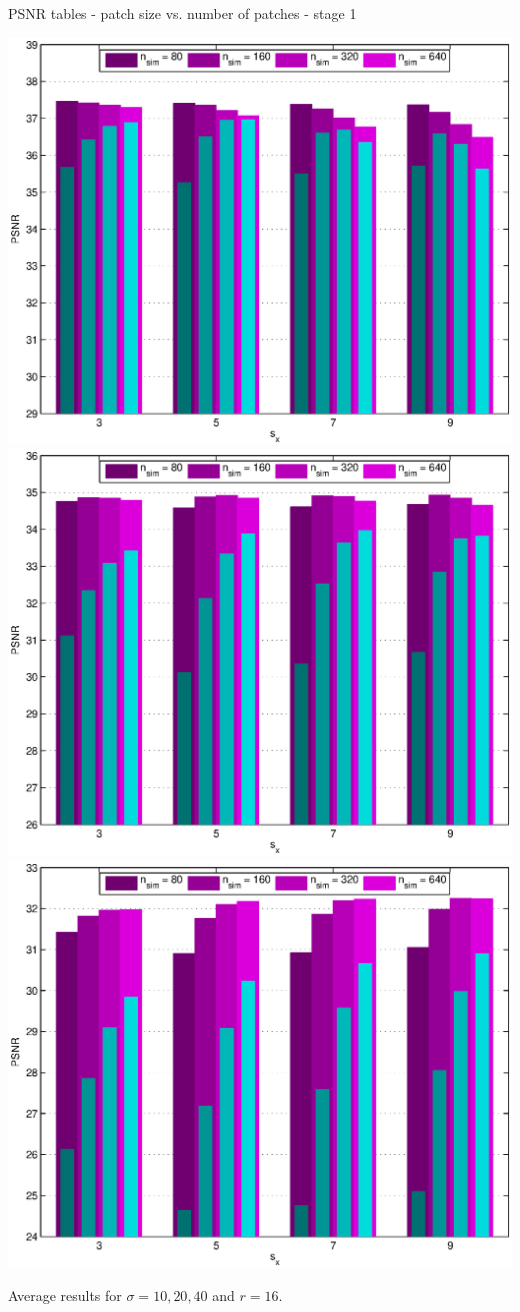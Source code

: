 \documentclass[mathserif, 8pt]{beamer}
\begin{document}
\begin{frame}{PSNR tables - patch size vs. number of patches - stage 1}
	\begin{center}
		\includegraphics[width=.33\textwidth]{psnr_px1-np1-bars_1r16_s10_average.eps}%
		\includegraphics[width=.33\textwidth]{psnr_px1-np1-bars_1r16_s20_average.eps}%
		\includegraphics[width=.33\textwidth]{psnr_px1-np1-bars_1r16_s40_average.eps}
	\end{center}
	\begin{center}
	Average results for $\sigma = 10, 20, 40$ and $r = 16$.
	\end{center}
\end{frame}
\end{document}
